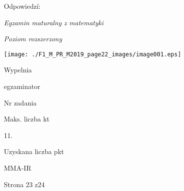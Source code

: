 \documentclass[a4paper,12pt]{article}
\begin{document}
Odpowiedzí:

{\it Egzamin maturalny z matematyki}

{\it Poziom rozszerzony}
\begin{center}
\texttt{[image: ./F1\_M\_PR\_M2019\_page22\_images/image001.eps]}
\end{center}
Wypelnia

egzaminator

Nr zadania

Maks. liczba kt

11.

Uzyskana liczba pkt

MMA-IR

Strona 23 z24
\end{document}
